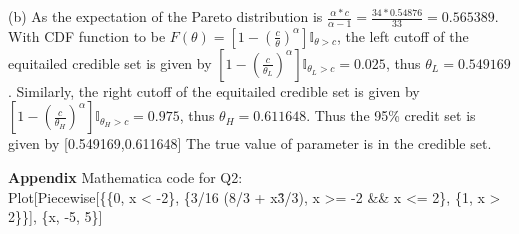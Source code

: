 \documentclass{homeworg}
\begin{document}
(b) As the expectation of the Pareto distribution is $\frac{\alpha*c}{\alpha-1}=\frac{34*0.54876}{33}=0.565389$. With CDF function to be $F(\theta)=[1-(\frac{c}{\theta})^\alpha]\mathbb{I}_{\theta>c}$, the left cutoff of the equitailed credible set is given by $[1-(\frac{c}{\theta_L})^\alpha]\mathbb{I}_{\theta_L>c}=0.025$, thus $\theta_L=0.549169$. Similarly, the right cutoff of the equitailed credible set is given by $[1-(\frac{c}{\theta_H})^\alpha]\mathbb{I}_{\theta_H>c}=0.975$, thus $\theta_H=0.611648$. Thus the 95\% credit set is given by [0.549169,0.611648] The true value of parameter is in the credible set.
%
%


%
%
\newpage
\textbf{Appendix}
Mathematica code for Q2:\\

Plot[Piecewise[\{\{0, x < -2\}, \{3/16 (8/3 + x\^3/3), x >= -2 \&\& x <= 2\}, \{1, x > 2\}\}], \{x, -5, 5\}]
\end{document}
